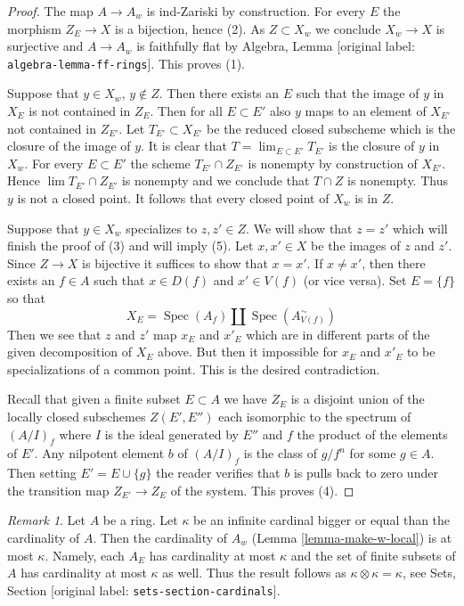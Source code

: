 \documentclass[10pt,a4paper]{article}
\theoremstyle{plain}
\theoremstyle{definition}
\theoremstyle{remark}
\newtheorem{remark}[subsection]{Remark}
\numberwithin{equation}{subsection}
\def\lim{\mathop{\mathrm{lim}}\nolimits}
\def\Spec{\mathop{\mathrm{Spec}}}
\begin{document}
\begin{proof}
The map $A \to A_w$ is ind-Zariski by construction.
For every $E$ the morphism $Z_E \to X$ is a bijection, hence (2).
As $Z \subset X_w$ we conclude $X_w \to X$ is surjective and
$A \to A_w$ is faithfully flat by
Algebra, Lemma \textnormal{[original label: \nolinkurl{algebra-lemma-ff-rings}]}. This proves (1).

\medskip\noindent
Suppose that $y \in X_w$, $y \not \in Z$. Then there
exists an $E$ such that the image of $y$ in $X_E$ is not contained in
$Z_E$. Then for all $E \subset E'$ also $y$ maps to an element of $X_{E'}$
not contained in $Z_{E'}$. Let $T_{E'} \subset X_{E'}$ be the reduced
closed subscheme which is the closure of the image of $y$. It is
clear that $T = \lim_{E \subset E'} T_{E'}$ is the closure of $y$ in $X_w$.
For every $E \subset E'$ the scheme $T_{E'} \cap Z_{E'}$ is nonempty
by construction of $X_{E'}$. Hence $\lim T_{E'} \cap Z_{E'}$ is nonempty
and we conclude that $T \cap Z$ is nonempty. Thus $y$ is not a closed point.
It follows that every closed point of $X_w$ is in $Z$.

\medskip\noindent
Suppose that $y \in X_w$ specializes to $z, z' \in Z$. We will show that
$z = z'$ which will finish the proof of (3) and will imply (5).
Let $x, x' \in X$ be the images of $z$ and $z'$. Since $Z \to X$ is
bijective it suffices to show that $x = x'$. If $x \not = x'$, then
there exists an $f \in A$ such that $x \in D(f)$ and $x' \in V(f)$
(or vice versa). Set $E = \{f\}$ so that
$$
X_E = \Spec(A_f) \amalg \Spec(A_{V(f)}^\sim)
$$
Then we see that $z$ and $z'$ map $x_E$ and $x'_E$ which are in different
parts of the given decomposition of $X_E$ above. But then it impossible
for $x_E$ and $x'_E$ to be specializations of a common point.
This is the desired contradiction.

\medskip\noindent
Recall that given a finite subset $E \subset A$ we have $Z_E$
is a disjoint union of the locally closed subschemes $Z(E', E'')$
each isomorphic to the spectrum of $(A/I)_f$ where $I$ is the ideal
generated by $E''$ and $f$ the product of the elements of $E'$.
Any nilpotent element $b$ of $(A/I)_f$ is the class of $g/f^n$
for some $g \in A$. Then setting $E' = E \cup \{g\}$ the reader
verifies that $b$ is pulls back to zero under the transition map
$Z_{E'} \to Z_E$ of the system. This proves (4).
\end{proof}

\begin{remark}
\label{remark-size-w}
Let $A$ be a ring. Let $\kappa$ be an infinite cardinal bigger or
equal than the cardinality of $A$. Then the cardinality of $A_w$
(Lemma \ref{lemma-make-w-local})
is at most $\kappa$. Namely, each $A_E$ has cardinality at most
$\kappa$ and the set of finite subsets of $A$ has cardinality at most $\kappa$
as well. Thus the result follows as $\kappa \otimes \kappa = \kappa$, see
Sets, Section \textnormal{[original label: \nolinkurl{sets-section-cardinals}]}.
\end{remark}
\end{document}

